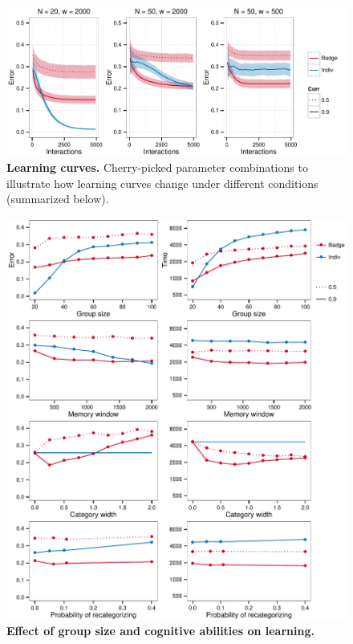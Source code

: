 \begin{figure}[ht]

\label{learning_curves}
\includegraphics[width=.95\textwidth]{figures/learning_curves.pdf}
\caption{\sffamily\small\textbf{Learning curves.}
     Cherry-picked parameter combinations to illustrate how learning curves change under different conditions (summarized below).}
\end{figure}

\begin{figure}
\label{parameters}
\includegraphics[width=6.85in]{figures/parameters.pdf}
\caption{\sffamily\small\textbf{Effect of group size and cognitive abilities on learning.}}
\end{figure}

